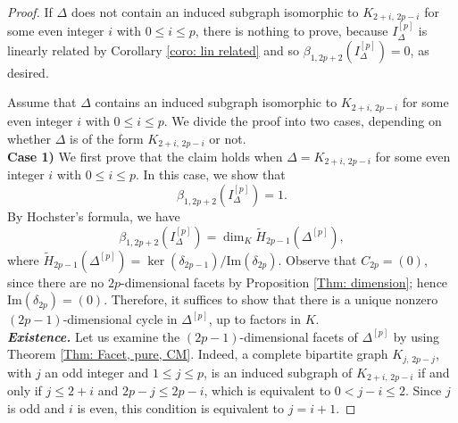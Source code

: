 \documentclass[12pt]{amsart}
\begin{document}
\begin{proof}
If $\Delta$ does not contain an induced subgraph isomorphic to $K_{2+i,\,2p-i}$ for some even integer $i$ with $0 \leq i \leq p$, there is nothing to prove, because $I_{\Delta}^{[p]}$ is linearly related by Corollary \ref{coro: lin related} and so $\beta_{1,2p+2}(I_{\Delta}^{[p]})=0$, as desired.

Assume that $\Delta$ contains an induced subgraph isomorphic to $K_{2+i,\,2p-i}$ for some even integer $i$ with $0 \leq i \leq p$. We divide the proof into two cases, depending on whether $\Delta$ is of the form $K_{2+i,\,2p-i}$ or not.\\


\textbf{Case 1)} We first prove that the claim holds when $\Delta = K_{2+i,\,2p-i}$ for some even
integer $i$ with $0 \leq i \leq p$. In this case, we show that
\[
\beta_{1,2p+2}(I_{\Delta}^{[p]}) = 1.
\]
By Hochster's formula, we have
\[
\beta_{1,2p+2}(I_{\Delta}^{[p]}) = \dim_K \tilde{H}_{2p-1}(\Delta^{[p]}),
\]
where $\tilde{H}_{2p-1}(\Delta^{[p]}) = \ker(\delta_{2p-1}) / \mathrm{Im}(\delta_{2p})$.
Observe that $C_{2p} = (0)$, since there are no $2p$-dimensional facets by Proposition \ref{Thm: dimension}; hence $\mathrm{Im}(\delta_{2p}) = (0)$. Therefore, it suffices to show that there is a unique nonzero $(2p-1)$-dimensional cycle in $\Delta^{[p]}$, up to factors in $K$.\\

\textbf{\textit{Existence.}} Let us examine the $(2p-1)$-dimensional facets of $\Delta^{[p]}$ by using Theorem \ref{Thm: Facet, pure, CM}. Indeed, a complete bipartite graph $K_{j,\,2p-j}$, with $j$ an odd integer and $1 \leq j \leq p$, is an induced subgraph of $K_{2+i,\,2p-i}$ if and only if $j \leq 2+i$ and $2p-j \leq 2p-i$, which is equivalent to $0 < j-i \leq 2$. Since $j$ is odd and $i$ is even, this condition is equivalent to $j = i+1$. 



\end{proof}
\end{document}
